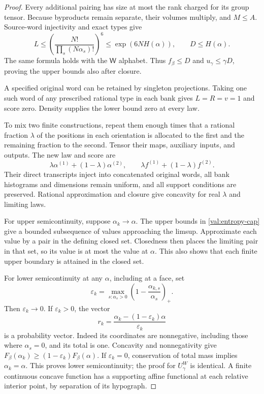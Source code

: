 \documentclass[11pt]{article}
\numberwithin{equation}{section}
\theoremstyle{definition}
\theoremstyle{remark}
\begin{document}
\begin{proof}
Every additional pairing has size at most the rank charged for its group
tensor.  Because byproducts remain separate, their volumes multiply, and
$M\le A$.  Source-word injectivity and exact types give
\[
 L\le\left(\frac{N!}{\prod_s(N\alpha_s)!}\right)^6
 \le \exp(6NH(\alpha)),
 \qquad D\le H(\alpha).
\]
The same formula holds with the $\mathsf W$ alphabet.  Thus $f_\beta\le D$ and
$u_\gamma\le\gamma D$, proving the upper bounds also after closure.

A specified original word can be retained by singleton projections.  Taking
one such word of any prescribed rational type in each bank gives $L=R=v=1$
and score zero.  Density supplies the lower bound zero at every law.

To mix two finite constructions, repeat them enough times that a rational
fraction $\lambda$ of the positions in each orientation is allocated to the
first and the remaining fraction to the second.  Tensor their maps, auxiliary
inputs, and outputs.  The new law and score are
\[
 \lambda\alpha^{(1)}+(1-\lambda)\alpha^{(2)},\qquad
 \lambda f^{(1)}+(1-\lambda)f^{(2)}.
\]
Their direct transcripts inject into concatenated original words, all bank
histograms and dimensions remain uniform, and all support conditions are
preserved.  Rational approximation and closure give concavity for real
$\lambda$ and limiting laws.

For upper semicontinuity, suppose $\alpha_k\to\alpha$.  The upper bounds in
\eqref{val:entropy-cap} give a bounded subsequence of values approaching the
limsup.  Approximate each value by a pair in the defining closed set.  Closedness
then places the limiting pair in that set, so its value is at most the value
at $\alpha$.  This also shows that each finite upper boundary is attained in
the closed set.

For lower semicontinuity at any $\alpha$, including at a face, set
\[
 \varepsilon_k=
 \max_{s:\alpha_s>0}
       \left(1-\frac{\alpha_{k,s}}{\alpha_s}\right)_+.
\]
Then $\varepsilon_k\to0$.  If $\varepsilon_k>0$, the vector
\[
 r_k=\frac{\alpha_k-(1-\varepsilon_k)\alpha}{\varepsilon_k}
\]
is a probability vector.  Indeed its coordinates are nonnegative, including
those where $\alpha_s=0$, and its total is one.  Concavity and nonnegativity
give $F_\beta(\alpha_k)\ge(1-\varepsilon_k)F_\beta(\alpha)$.
If $\varepsilon_k=0$, conservation of total mass implies
$\alpha_k=\alpha$.  This proves lower semicontinuity; the proof for $U^W_\gamma$
is identical.  A finite continuous concave function has a supporting affine
functional at each relative interior point, by separation of its hypograph.
\end{proof}
\end{document}
